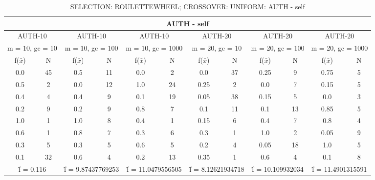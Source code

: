 \begin{table}[H]
	\centering
	\caption{SELECTION: ROULETTEWHEEL; CROSSOVER: UNIFORM: AUTH - self}
	\begin{adjustbox}{width=1\textwidth}
		\begin{tabular}{ |c|c||c|c||c|c||c|c||c|c||c|c| }
			\hline
			\multicolumn{12}{|c|}{AUTH - self} \\
			\hline
			\multicolumn{2}{|c||}{AUTH-10} & \multicolumn{2}{c||}{AUTH-10} & \multicolumn{2}{c||}{AUTH-10} & \multicolumn{2}{c||}{AUTH-20} & \multicolumn{2}{c||}{AUTH-20} & \multicolumn{2}{c|}{AUTH-20}\\
			\hline
			\multicolumn{2}{|c||}{m = 10, gc = 10} & \multicolumn{2}{c||}{m = 10, gc = 100} & \multicolumn{2}{c||}{m = 10, gc = 1000} & \multicolumn{2}{c||}{m = 20, gc = 10} & \multicolumn{2}{c||}{m = 20, gc = 100} & \multicolumn{2}{c|}{m = 20, gc = 1000}\\
			\hline
			f($\bar{x}$) & N & f($\bar{x}$) & N & f($\bar{x}$) & N & f($\bar{x}$) & N & f($\bar{x}$) & N & f($\bar{x}$) & N\\
			\hline
			\hline
			0.0 & 45 & 0.5 & 11 & 0.0 & 2 & 0.0 & 37 & 0.25 & 9 & 0.75 & 5\\
			0.5 & 2 & 0.0 & 12 & 1.0 & 24 & 0.25 & 2 & 0.0 & 7 & 0.15 & 5\\
			0.4 & 4 & 0.4 & 9 & 0.1 & 19 & 0.05 & 38 & 0.15 & 5 & 0.0 & 3\\
			0.2 & 9 & 0.2 & 9 & 0.8 & 7 & 0.1 & 11 & 0.1 & 13 & 0.85 & 5\\
			1.0 & 1 & 1.0 & 8 & 0.4 & 1 & 0.15 & 6 & 0.4 & 7 & 0.8 & 4\\
			0.6 & 1 & 0.8 & 7 & 0.3 & 6 & 0.3 & 1 & 1.0 & 2 & 0.05 & 9\\
			0.3 & 5 & 0.3 & 5 & 0.6 & 5 & 0.2 & 4 & 0.05 & 18 & 1.0 & 5\\
			0.1 & 32 & 0.6 & 4 & 0.2 & 13 & 0.35 & 1 & 0.6 & 4 & 0.1 & 8\\
			\hline
			\multicolumn{2}{|c||}{\^{f} = 0.116} & \multicolumn{2}{c||}{\^{f} = 9.87437769253} & \multicolumn{2}{c||}{\^{f} = 11.0479556505} & \multicolumn{2}{c||}{\^{f} = 8.12621934718} & \multicolumn{2}{c||}{\^{f} = 10.109932034} & \multicolumn{2}{c|}{\^{f} = 11.4901315591}\\
			\hline
		\end{tabular}
	\end{adjustbox}
\end{table}
